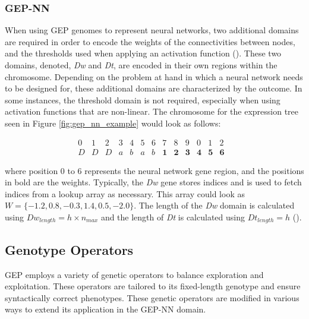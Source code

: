 \subsubsection{GEP-NN}
When using GEP genomes to represent neural networks, two additional domains are required in order to encode the weights of the connectivities between nodes, and the thresholds used when applying an activation function (\cite{ferreira2006gene}). These two domains, denoted, \textit{Dw} and \textit{Dt}, are encoded in their own regions within the chromosome. Depending on the problem at hand in which a neural network needs to be designed for, these additional domains are characterized by the outcome. In some instances, the threshold domain is not required, especially when using activation functions that are non-linear. The chromosome for the expression tree seen in Figure \ref{fig:gep_nn_example} would look as follows:

\begin{equation}\label{alg:gep__nn_chromosome_example}
    \begin{array}{cccccccccccccccccc}
        0 & 1 & 2 & 3 & 4 & 5 & 6 & 7 & 8 & 9 & 0 & 1 & 2 \\
        D & D & D & a & b & a & b & \textbf{1} & \textbf{2} & \textbf{3} & \textbf{4} & \textbf{5} & \textbf{6} &
    \end{array}
\end{equation}

\noindent where position 0 to 6 represents the neural network gene region, and the positions in bold are the weights. Typically, the \textit{Dw} gene stores indices and is used to fetch indices from a lookup array as necessary. This array could look as \textit{$W = \{-1.2, 0.8, -0.3, 1.4, 0.5, -2.0\}$}. The length of the \textit{Dw} domain is calculated using \textit{$Dw_{length} = h \times n_{max}$} and the length of \textit{Dt} is calculated using \textit{$Dt_{length} = h$} (\cite{ferreira2006gene}).


\subsection{Genotype Operators}\label{sec:gep_genetic_operators}
GEP employs a variety of genetic operators to balance exploration and exploitation. These operators are tailored to its fixed-length genotype and ensure syntactically correct phenotypes. These genetic operators are modified in various ways to extend its application in the GEP-NN domain.

